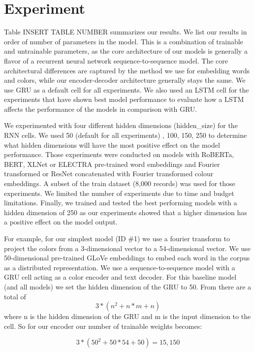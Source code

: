 \section{Experiment}

Table INSERT TABLE NUMBER summarizes our results. We list our results in order of number of parameters in the model. This is a combination of trainable and untrainable parameters, as the core architecture of our models is generally a flavor of a recurrent neural network sequence-to-sequence model. The core architectural differences are captured by the method we use for embedding words and colors, while our encoder-decoder architecture generally stays the same. We use GRU as a default cell for all experiments. We also used an LSTM cell for the experiments that have shown best model performance to evaluate how a LSTM affects the performance of the models in comparison with GRU.

\par
We experimented with four different hidden dimensions (hidden\_size) for the RNN cells. We used 50 (default for all experiments) , 100, 150, 250 to determine what hidden dimensions will have the most positive effect on the model performance. Those experiments were conducted on models with RoBERTa, BERT, XLNet or ELECTRA pre-trained word embeddings and Fourier transformed or ResNet concatenated with Fourier transformed colour embeddings. A subset of the train dataset (8,000 records) was used for those experiments. We limited the number of experiments due to time and budget limitations. Finally, we trained and tested the best performing models with a hidden dimension of 250 as our experiments showed that a higher dimension has a positive effect on the model output.

\par
For example, for our simplest model (ID \#1) we use a fourier transform to project the colors from a 3-dimensional vector to a 54-dimensional vector. We use 50-dimensional pre-trained GLoVe embeddings to embed each word in the corpus as a distributed representation. We use a sequence-to-sequence model with a GRU cell acting as a color encoder and text decoder.  For this baseline model (and all models) we set the hidden dimension of the GRU to 50. From \citep{dey-2017-gru} there are a total of \[3*(n^2 + n*m +n)\] where n is the hidden dimension of the GRU and m is the input dimension to the cell. So for our encoder our number of trainable weights becomes:

\[3*(50^2 + 50*54 +50) = 15,150\]

